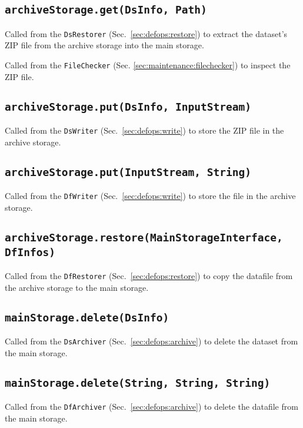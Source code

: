 \documentclass[paper=a4]{scrartcl}
\begin{document}
\subsection{\texttt{archiveStorage.get(DsInfo, Path)}}

Called from the \texttt{DsRestorer} (Sec.\ \ref{sec:defops:restore})
to extract the dataset's ZIP file from the archive storage into the
main storage.

Called from the \texttt{FileChecker}
(Sec. \ref{sec:maintenance:filechecker}) to inspect the ZIP file.

\subsection{\texttt{archiveStorage.put(DsInfo, InputStream)}}

Called from the \texttt{DsWriter} (Sec.\ \ref{sec:defops:write}) to
store the ZIP file in the archive storage.

\subsection{\texttt{archiveStorage.put(InputStream, String)}}

Called from the \texttt{DfWriter} (Sec.\ \ref{sec:defops:write}) to
store the file in the archive storage.

\subsection{\texttt{archiveStorage.restore(MainStorageInterface, DfInfos)}}

Called from the \texttt{DfRestorer} (Sec.\ \ref{sec:defops:restore})
to copy the datafile from the archive storage to the main storage.

\subsection{\texttt{mainStorage.delete(DsInfo)}}

Called from the \texttt{DsArchiver} (Sec.\ \ref{sec:defops:archive})
to delete the dataset from the main storage.

\subsection{\texttt{mainStorage.delete(String, String, String)}}

Called from the \texttt{DfArchiver} (Sec.\ \ref{sec:defops:archive})
to delete the datafile from the main storage.
\end{document}
